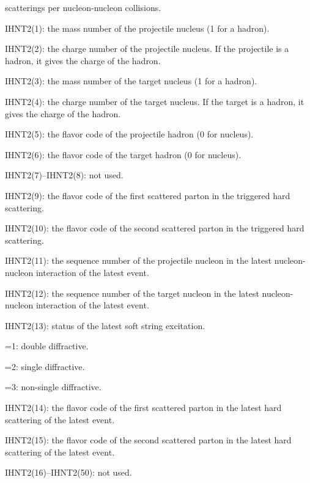 \begin{description}
                scatterings per nucleon-nucleon collisions.
\item{}IHNT2(1): the mass number of the projectile nucleus (1 for a hadron).
\item{}IHNT2(2): the charge number of the projectile nucleus. If the
                projectile is a hadron, it gives the charge of the hadron.
\item{}IHNT2(3): the mass number of the target nucleus (1 for a hadron).
\item{}IHNT2(4): the charge number of the target nucleus. If the target 
                is a hadron, it gives the charge of the hadron.
\item{}IHNT2(5): the flavor code of the projectile hadron (0 for nucleus).
\item{}IHNT2(6): the flavor code of the target hadron (0 for nucleus).
\item{}IHNT2(7)--IHNT2(8): not used.
\item{}IHNT2(9): the flavor code of the first scattered parton in the 
                triggered hard scattering.
\item{}IHNT2(10): the flavor code of the second scattered parton in the 
                triggered hard scattering.
\item{}IHNT2(11): the sequence number of the projectile nucleon in the 
                latest nucleon-nucleon interaction of the latest event.
\item{}IHNT2(12): the sequence number of the target nucleon in the latest 
                nucleon-nucleon interaction of the latest event.
\item{}IHNT2(13): status of the latest soft string excitation.
        \vspace{-12.0pt}
        \begin{description}
        \itemsep=-4.0pt
                \item{}=1: double diffractive.
                \item{}=2: single diffractive. 
                \item{}=3: non-single diffractive.
        \end{description}
        \vspace{-4.0pt}
\item{}IHNT2(14): the flavor code of the first scattered parton in the 
                latest hard scattering of the latest event.
\item{}IHNT2(15): the flavor code of the second scattered parton in the 
                latest hard scattering of the latest event.
\item{}IHNT2(16)--IHNT2(50): not used.

\end{description}


